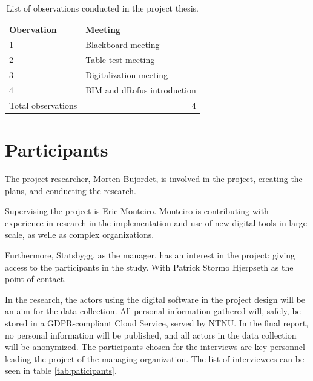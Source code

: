 \begin{table}
    \begin{center}
        \begin{tabular}{@{}ll@{}}
        \toprule
        \textbf{Obervation} & \textbf{Meeting}       \\ \midrule
        1                   & Blackboard-meeting     \\
        2                   & Table-test meeting     \\
        3                   & Digitalization-meeting \\
        4                   & BIM and dRofus introduction \\
        Total observations  & \multicolumn{1}{r}{4}  \\ \bottomrule
        \end{tabular}
        \caption{List of observations conducted in the project thesis.}
        \label{tab:observations}
    \end{center}
\end{table}

\section{Participants}
The project researcher, Morten Bujordet, is involved in the project, creating the plans, and conducting the research.
	 
Supervising the project is Eric Monteiro. Monteiro is contributing with experience in research in the implementation and use of new digital tools in large scale, as welle as complex organizations. 

Furthermore, Statsbygg, as the manager, has an interest in the project: giving access to the participants in the study. With Patrick Stormo Hjerpseth as the point of contact.
	 
In the research, the actors using the digital software in the project design will be an aim for the data collection. All personal information gathered will, safely, be stored in a GDPR-compliant Cloud Service, served by NTNU. In the final report, no personal information will be published, and all actors in the data collection will be anonymized. The participants chosen for the interviews are key personnel leading the project of the managing organization. The list of interviewees can be seen in table \ref{tab:paticipants}. 

